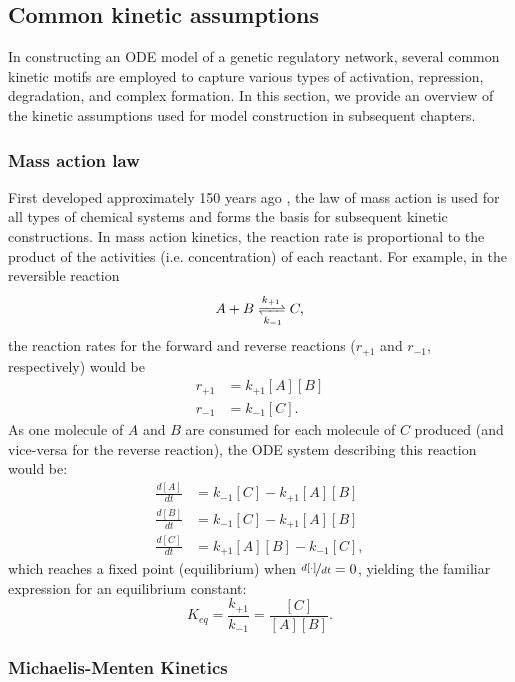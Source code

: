\subsection{Common kinetic assumptions}\label{sec:kinetic}

In constructing an ODE model of a genetic regulatory network, several common kinetic motifs are employed to capture various types of activation, repression, degradation, and complex formation.
In this section, we provide an overview of the kinetic assumptions used for model construction in subsequent chapters.

\subsubsection{Mass action law}

First developed approximately 150 years ago \cite{Voit2015}, the law of mass action is used for all types of chemical systems and forms the basis for subsequent kinetic constructions. 
In mass action kinetics, the reaction rate is proportional to the product of the activities (i.e. concentration) of each reactant.
For example, in the reversible reaction
\[
  A + B \xrightleftharpoons[k_{-1}]{k_{+1}} C,
\]
the reaction rates for the forward and reverse reactions ($r_{+1}$ and $r_{-1}$, respectively) would be
\begin{align*}
  r_{+1} &= k_{+1}[A][B]\\
  r_{-1} &= k_{-1}[C].
\end{align*}
As one molecule of $A$ and $B$ are consumed for each molecule of $C$ produced (and vice-versa for the reverse reaction), the ODE system describing this reaction would be:
\begin{align*}
  \frac{d[A]}{dt} &= k_{-1}[C] - k_{+1}[A][B]\\
  \frac{d[B]}{dt} &= k_{-1}[C] - k_{+1}[A][B]\\
  \frac{d[C]}{dt} &= k_{+1}[A][B] - k_{-1}[C],
\end{align*}
which reaches a fixed point (equilibrium) when $\nicefrac{d[\cdot]}{dt} = 0$, yielding the familiar expression for an equilibrium constant:
\[
  K_{eq} = \frac{k_{+1}}{k_{-1}} = \frac{[C]}{[A][B]}.
\]

\subsubsection{Michaelis-Menten Kinetics}\label{sec:mmenten}

